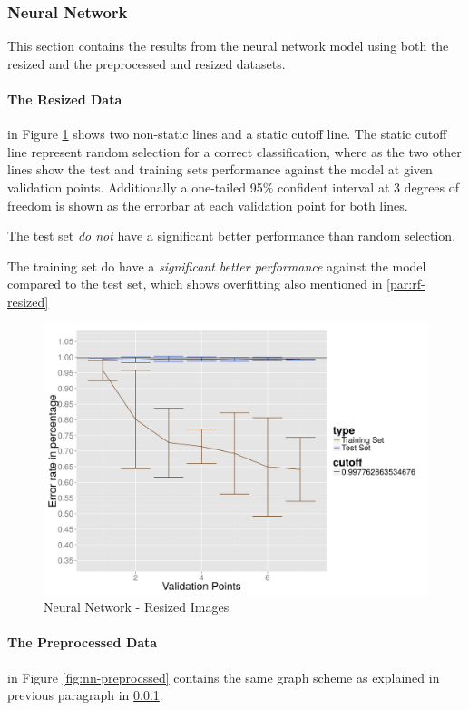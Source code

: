 \subsubsection{Neural Network}
\label{subsubsec:neuralnetwork}
This section contains the results from the neural network model using both the resized and the preprocessed and resized datasets.

\paragraph{The Resized Data}
in Figure \ref{fig:nn-resized} shows two non-static lines and a static cutoff line.
The static cutoff line represent random selection for a correct classification, where as the two other lines show the test and training sets performance against the model at given validation points. Additionally a one-tailed 95\% confident interval at 3 degrees of freedom is shown as the errorbar at each validation point for both lines.

The test set \emph{do not} have a significant better performance than random selection.

The training set do have a \emph{significant better performance} against the model compared to the test set, which shows overfitting also mentioned in \ref{par:rf-resized}

\begin{figure}
  \centering
  \includegraphics[width=0.9\linewidth]{Images/DNNraw}
  \caption{Neural Network - Resized Images}
  \label{fig:nn-resized}
\end{figure}

\paragraph{The Preprocessed Data}
in Figure \ref{fig:nn-preprocssed} contains the same graph scheme as explained in previous paragraph in \ref{subsubsec:neuralnetwork}. 

